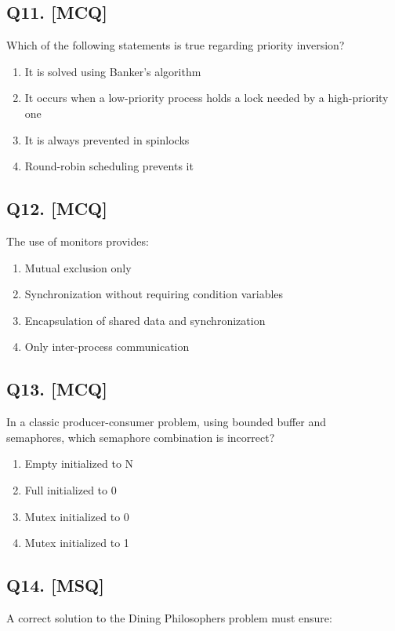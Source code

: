 \newpage
\subsection*{Q11. [MCQ]}
Which of the following statements is true regarding priority inversion?

\begin{enumerate}[label=(\alph*)]
    \item It is solved using Banker's algorithm
    \item It occurs when a low-priority process holds a lock needed by a high-priority one
    \item It is always prevented in spinlocks
    \item Round-robin scheduling prevents it
\end{enumerate}

\subsection*{Q12. [MCQ]}
The use of monitors provides:

\begin{enumerate}[label=(\alph*)]
    \item Mutual exclusion only
    \item Synchronization without requiring condition variables
    \item Encapsulation of shared data and synchronization
    \item Only inter-process communication
\end{enumerate}

\subsection*{Q13. [MCQ]}
In a classic producer-consumer problem, using bounded buffer and\\
semaphores, which semaphore combination is incorrect?

\begin{enumerate}[label=(\alph*)]
    \item Empty initialized to N
    \item Full initialized to 0
    \item Mutex initialized to 0
    \item Mutex initialized to 1
\end{enumerate}

\subsection*{Q14. [MSQ]}
A correct solution to the Dining Philosophers problem must ensure:
  

